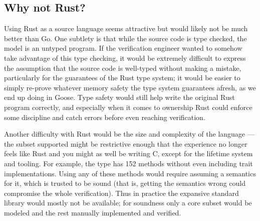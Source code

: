 \subsection{Why not Rust?}

Using Rust as a source language seems attractive but would likely not be much
better than Go. One subtlety is that while the source code is type checked, the
model is an untyped program. If the verification engineer wanted to somehow take
advantage of this type checking, it would be extremely difficult to express the
assumption that the source code is well-typed without making a mistake,
particularly for the guarantees of the Rust type system; it would be easier to
simply re-prove whatever memory safety the type system guarantees afresh, as we
end up doing in Goose. Type safety would still help write the original Rust
program correctly, and especially when it comes to ownership Rust could enforce
some discipline and catch errors before even reaching verification.

Another difficulty with Rust would be the size and complexity of the language
--- the subset supported might be restrictive enough that the experience no
longer feels like Rust and you might as well be writing C, except for the
lifetime system and tooling. For example, the  type has 152 methods
without even including trait implementations. Using any of these methods would
require assuming a semantics for it, which is trusted to be sound (that is,
getting the semantics wrong could compromise the whole verification). Thus in
practice the expansive standard library would mostly not be available; for
soundness only a core subset would be modeled and the rest manually implemented
and verified.
